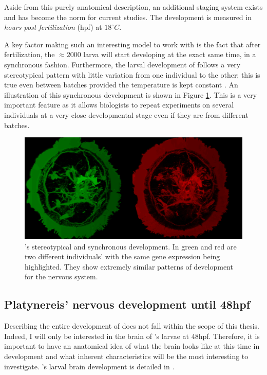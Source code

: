     Aside from this purely anatomical description, an additional staging system exists and has become the norm for current studies. The development is measured in \textit{hours post fertilization} (hpf) at $18^{\circ}C$.
    
    A key factor making \platy{} such an interesting model to work with is the fact that after fertilization, the $\approx 2000$ larva will start developing at the exact same time, in a synchronous fashion. Furthermore, the larval development of \platy{} follows a very stereotypical pattern with little variation from one individual to the other; this is true even between batches provided the temperature is kept constant \citep{fischer04,dorresteijn90}. An illustration of this synchronous development is shown in Figure \ref{fig:brain_comparison}. This is a very important feature as it allows biologists to repeat experiments on several individuals at a very close developmental stage even if they are from different batches.\\
    
\begin{figure}[bth]
  \includegraphics[width=\linewidth]{gfx/chapter1/brain_comparison.png}
  \caption{\platyfull{}'s stereotypical and synchronous development. In green and red are two different \platy{} individuals' with the same gene expression being highlighted. They show extremely similar patterns of development for the nervous system.}
  \label{fig:brain_comparison}
\end{figure}

	 
	  \subsection{Platynereis' nervous development until 48hpf}
	 Describing the entire development of \platy{} does not fall within the scope of this thesis. Indeed, I will only be interested in the brain of \platy{}'s larvae at 48hpf. Therefore, it is important to have an anatomical idea of what the brain looks like at this time in development and what inherent characteristics will be the most interesting to investigate. \platy{}'s larval brain development is detailed in \citep{Fischer10}.\\
	 
